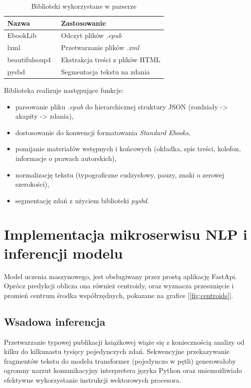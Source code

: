 \begin{table}[htbp]
    \centering
    \caption{Biblioteki wykorzystane w parserze}
    \label{tab:parser_libs}
    \begin{tabular}{l l}
        \toprule
        \textbf{Nazwa} & \textbf{Zastosowanie}\\
        \midrule
        EbookLib~\cite{epublib} & Odczyt plików \textit{.epub}\\
        lxml~\cite{lxml} & Przetwarzanie plików \textit{.xml}\\
        beautifulsoup4~\cite{BeautifulSoup} & Ekstrakcja treści z plików HTML\\
        pysbd~\cite{pysbd} & Segmentacja tekstu na zdania\\
        \bottomrule
    \end{tabular}
\end{table}

Biblioteka realizuje następujące funkcje:
\begin{itemize}
    \item parsowanie pliku \textit{.epub} do hierarchicznej struktury JSON
          (rozdziały -> akapity -> zdania),
    \item dostosowanie do konwencji formatowania \textit{Standard Ebooks},
    \item pomijanie materiałów wstępnych i końcowych (okładka, spis treści,
          kolofon, informacje o prawach autorskich),
    \item normalizację tekstu (typograficzne cudzysłowy, pauzy, znaki o zerowej szerokości),
    \item segmentację zdań z użyciem biblioteki \textit{pysbd}.
\end{itemize}



\section{Implementacja mikroserwisu NLP i inferencji modelu}
Model uczenia maszynowego, jest obsługiwany przez prostą aplikację FastApi. Oprócz predykcji
oblicza ona również centroidy, oraz wyznacza przesunięcie i promień centrum środka współrzędnych,
pokazane na grafice [\ref{fig:centroids}].

\subsection{Wsadowa inferencja}

Przetwarzanie typowej publikacji książkowej wiąże się z koniecznością analizy od kilku do kilkunastu 
tysięcy pojedynczych zdań. Sekwencyjne przekazywanie fragmentów tekstu do modelu transformer 
(pojedynczo w pętli) generowałoby ogromny narzut komunikacyjny interpretera języka Python oraz 
uniemożliwiało efektywne wykorzystanie instrukcji wektorowych procesora. 

